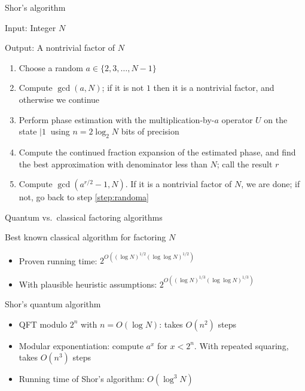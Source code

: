 
\begin{frame}{Shor's algorithm}

Input: Integer $N$

Output: A nontrivial factor of $N$

\begin{enumerate}
  \item\label{step:randoma} Choose a random $a \in \{2,3,\ldots,N-1\}$
  \item Compute $\gcd(a,N)$; if it is not $1$ then it is a nontrivial factor, and otherwise we continue
  \item Perform phase estimation with the multiplication-by-$a$ operator $U$ on the state $|1\>$ using $n=2\log_2 N$ bits of precision
  \item\label{step:cfe} Compute the continued fraction expansion of the estimated phase, and find the best approximation with denominator less than $N$; call the result $r$
  \item Compute $\gcd(a^{r/2}-1,N)$.  If it is a nontrivial factor of $N$, we are done; if not, go back to step \ref{step:randoma}
\end{enumerate}

\end{frame}


\begin{frame}{Quantum vs.\ classical factoring algorithms}
  
Best known classical algorithm for factoring $N$
\begin{itemize}
  \item Proven running time: $2^{O((\log N)^{1/2}(\log\log N)^{1/2})}$
  \item With plausible heuristic assumptions: $2^{O((\log N)^{1/3}(\log\log N)^{1/3})}$
\end{itemize}

\pause
\bigskip

Shor's quantum algorithm \pause
\begin{itemize}
  \item QFT modulo $2^n$ with $n=O(\log N)$: takes $O(n^2)$ steps \pause
  \item Modular exponentiation: compute $a^x$ for $x<2^n$.  With repeated squaring, takes $O(n^3)$ steps \pause
  \item Running time of Shor's algorithm: $O(\log^3 N)$
\end{itemize}
\end{frame}

